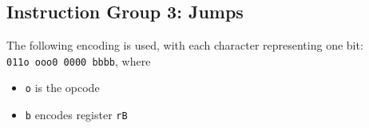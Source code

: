 \documentclass{article}
\begin{document}
\begin{itemize}
	\end{itemize}

	\doublespacing
	\subsection{Instruction Group 3:  Jumps}
	The following encoding is used, with each character representing one
	bit:  \\
	\texttt{011o ooo0 0000 bbbb}, where

	\singlespacing
	\begin{itemize}
		\item \texttt{o} is the opcode
		\item \texttt{b} encodes register \texttt{rB}
	\end{itemize}

	\doublespacing

\end{document}
